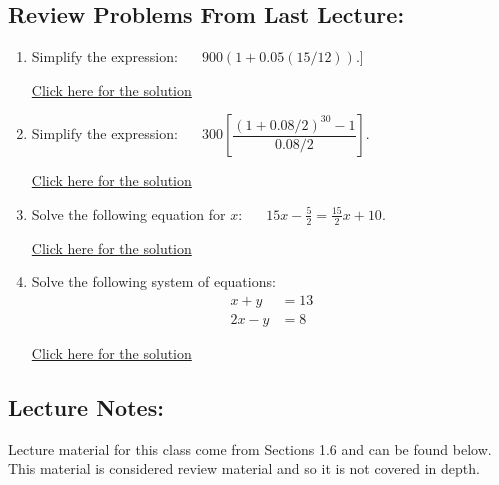 \documentclass[
]{book}
\providecommand{\tightlist}{%
  \setlength{\itemsep}{0pt}\setlength{\parskip}{0pt}}
\begin{document}
\subsection*{Review Problems From Last Lecture:}\label{review-problems-from-last-lecture}

\begin{enumerate}
\def\labelenumi{\arabic{enumi}.}
\tightlist
\item
  Simplify the expression: \(\;\;\;\;\; 900(1 + 0.05(15/12))\).{]}

  \href{https://youtu.be/zgLRtB3JUpE}{Click here for the solution}
\item
  Simplify the expression: \(\;\;\;\;\; 300 \left[\dfrac{(1 + 0.08/2)^{30} - 1}{0.08/2} \right]\).

  \href{https://youtu.be/Emv6osLWEvE}{Click here for the solution}
\item
  Solve the following equation for \(x\): \(\;\;\;\;\; 15 x - \frac{5}{2} = \frac{15}{2}x + 10\).

  \href{https://youtu.be/uo48t8kVRkI}{Click here for the solution}
\item
  Solve the following system of equations: \begin{align*} x + y &= 13\\ 2x - y &=8 \end{align*}

  \href{https://youtu.be/57H_RLVgpc8}{Click here for the solution}
\end{enumerate}

\subsection*{Lecture Notes:}\label{lecture-notes-1}

Lecture material for this class come from Sections 1.6 and can be found below. This material is considered review material and so it is not covered in depth.
\end{document}
